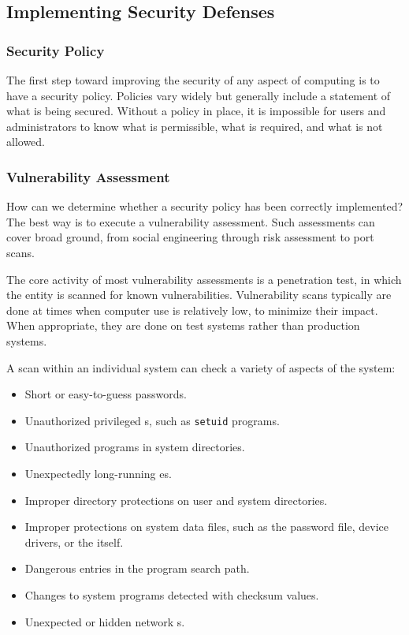 \subsection{Implementing Security Defenses}\label{subsec:Implementing_Security_Defenses}
\subsubsection{Security Policy}\label{subsubsec:Security_Policy}
The first step toward improving the security of any aspect of computing is to have a security policy.
Policies vary widely but generally include a statement of what is being secured.
Without a policy in place, it is impossible for users and administrators to know what is permissible, what is required, and what is not allowed.

\subsubsection{Vulnerability Assessment}\label{subsubsec:Vulnerability_Assessment}
How can we determine whether a security policy has been correctly implemented?
The best way is to execute a vulnerability assessment.
Such assessments can cover broad ground, from social engineering through risk assessment to port scans.

The core activity of most vulnerability assessments is a penetration test, in which the entity is scanned for known vulnerabilities.
Vulnerability scans typically are done at times when computer use is relatively low, to minimize their impact.
When appropriate, they are done on test systems rather than production systems.

A scan within an individual system can check a variety of aspects of the
system:
\begin{itemize}[noitemsep]
\item Short or easy-to-guess passwords.
\item Unauthorized privileged s, such as \texttt{setuid} programs.
\item Unauthorized programs in system directories.
\item Unexpectedly long-running es.
\item Improper directory protections on user and system directories.
\item Improper protections on system data files, such as the password file, device drivers, or the   itself.
\item Dangerous entries in the program search path.
\item Changes to system programs detected with checksum values.
\item Unexpected or hidden network s.
\end{itemize}

